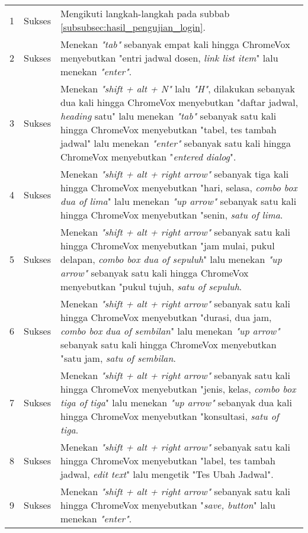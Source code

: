 \begin{table}[H]
\begin{tabular}{|c|c|p{10cm}|}
        \midrule
        1 & Sukses & Mengikuti langkah-langkah pada subbab \ref{subsubsec:hasil_pengujian_login}. \\
        2 & Sukses & Menekan \textit{"tab"} sebanyak empat kali hingga ChromeVox menyebutkan "entri jadwal dosen, \textit{link list item}" lalu menekan \textit{"enter"}. \\
        3 & Sukses & Menekan \textit{"shift + alt + N"} lalu \textit{"H"}, dilakukan sebanyak dua kali hingga ChromeVox menyebutkan "daftar jadwal, \textit{heading} satu" lalu menekan \textit{"tab"} sebanyak satu kali hingga ChromeVox menyebutkan "tabel, tes tambah jadwal" lalu menekan \textit{"enter"} sebanyak satu kali hingga ChromeVox menyebutkan "\textit{entered dialog}". \\
        4 & Sukses & Menekan \textit{"shift + alt + right arrow"} sebanyak tiga kali hingga ChromeVox menyebutkan "hari, selasa, \textit{combo box dua of lima}" lalu menekan \textit{"up arrow"} sebanyak satu kali hingga ChromeVox menyebutkan "senin, \textit{satu of lima}. \\
        5 & Sukses & Menekan \textit{"shift + alt + right arrow"} sebanyak satu kali hingga ChromeVox menyebutkan "jam mulai, pukul delapan, \textit{combo box dua of sepuluh}" lalu menekan \textit{"up arrow"} sebanyak satu kali hingga ChromeVox menyebutkan "pukul tujuh, \textit{satu of sepuluh}. \\
        6 & Sukses & Menekan \textit{"shift + alt + right arrow"} sebanyak satu kali hingga ChromeVox menyebutkan "durasi, dua jam, \textit{combo box dua of sembilan}" lalu menekan \textit{"up arrow"} sebanyak satu kali hingga ChromeVox menyebutkan "satu jam, \textit{satu of sembilan}. \\
        7 & Sukses & Menekan \textit{"shift + alt + right arrow"} sebanyak satu kali hingga ChromeVox menyebutkan "jenis, kelas, \textit{combo box tiga of tiga}" lalu menekan \textit{"up arrow"} sebanyak dua kali hingga ChromeVox menyebutkan "konsultasi, \textit{satu of tiga}. \\
        8 & Sukses & Menekan \textit{"shift + alt + right arrow"} sebanyak satu kali hingga ChromeVox menyebutkan "label, tes tambah jadwal, \textit{edit text}" lalu mengetik "Tes Ubah Jadwal". \\ 
        9 & Sukses & Menekan \textit{"shift + alt + right arrow"} sebanyak satu kali hingga ChromeVox menyebutkan "\textit{save, button}" lalu menekan \textit{"enter"}. \\ 

        \bottomrule

    \end{tabular}
\end{table}

